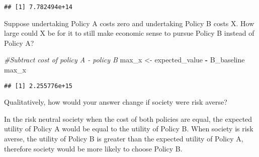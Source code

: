 \documentclass[
]{article}
\newenvironment{Shaded}{\begin{snugshade}}{\end{snugshade}}
\newcommand{\CommentTok}[1]{\textcolor[rgb]{0.56,0.35,0.01}{\textit{#1}}}
\newcommand{\DataTypeTok}[1]{\textcolor[rgb]{0.13,0.29,0.53}{#1}}
\newcommand{\DecValTok}[1]{\textcolor[rgb]{0.00,0.00,0.81}{#1}}
\newcommand{\FloatTok}[1]{\textcolor[rgb]{0.00,0.00,0.81}{#1}}
\newcommand{\KeywordTok}[1]{\textcolor[rgb]{0.13,0.29,0.53}{\textbf{#1}}}
\newcommand{\NormalTok}[1]{#1}
\newcommand{\OperatorTok}[1]{\textcolor[rgb]{0.81,0.36,0.00}{\textbf{#1}}}
\newcommand{\OtherTok}[1]{\textcolor[rgb]{0.56,0.35,0.01}{#1}}
\newcommand{\StringTok}[1]{\textcolor[rgb]{0.31,0.60,0.02}{#1}}
\begin{document}
\begin{Shaded}
\end{Shaded}

\begin{verbatim}
## [1] 7.782494e+14
\end{verbatim}

Suppose undertaking Policy A costs zero and undertaking Policy B costs
X. How large could X be for it to still make economic sense to pursue
Policy B instead of Policy A?

\begin{Shaded}
\begin{Highlighting}[]
\CommentTok{#Subtract cost of policy A - policy B}
\NormalTok{max_x <-}\StringTok{ }\NormalTok{expected_value }\OperatorTok{-}\StringTok{ }\NormalTok{B_baseline}
\NormalTok{max_x}
\end{Highlighting}
\end{Shaded}

\begin{verbatim}
## [1] 2.255776e+15
\end{verbatim}

Qualitatively, how would your answer change if society were risk averse?

In the risk neutral society when the cost of both policies are equal,
the expected utility of Policy A would be equal to the utility of Policy
B. When society is risk averse, the utility of Policy B is greater than
the expected utility of Policy A, therefore society would be more likely
to choose Policy B.
\end{document}
